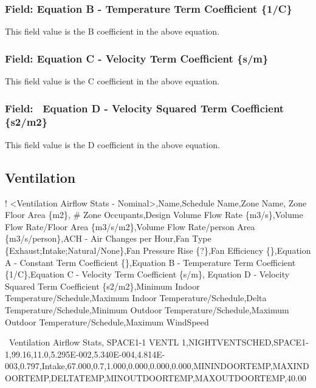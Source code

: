 \subsubsection{Field: Equation B - Temperature Term Coefficient \{1/C\}}\label{field-equation-b---temperature-term-coefficient-1c}

This field value is the B coefficient in the above equation.

\subsubsection{Field: Equation C - Velocity Term Coefficient \{s/m\}}\label{field-equation-c---velocity-term-coefficient-sm}

This field value is the C coefficient in the above equation.

\subsubsection{Field:~ Equation D - Velocity Squared Term Coefficient \{s2/m2\}}\label{field-equation-d---velocity-squared-term-coefficient-s2m2}

This field value is the D coefficient in the above equation.

\subsection{Ventilation}\label{ventilation}

! \textless{}Ventilation Airflow Stats - Nominal\textgreater{},Name,Schedule Name,Zone Name, Zone Floor Area \{m2\}, \# Zone Occupants,Design Volume Flow Rate \{m3/s\},Volume Flow Rate/Floor Area \{m3/s/m2\},Volume Flow Rate/person Area \{m3/s/person\},ACH - Air Changes per Hour,Fan Type \{Exhaust;Intake;Natural/None\},Fan Pressure Rise \{?\},Fan Efficiency \{\},Equation A - Constant Term Coefficient \{\},Equation B - Temperature Term Coefficient \{1/C\},Equation C - Velocity Term Coefficient \{s/m\}, Equation D - Velocity Squared Term Coefficient \{s2/m2\},Minimum Indoor Temperature/Schedule,Maximum Indoor Temperature/Schedule,Delta Temperature/Schedule,Minimum Outdoor Temperature/Schedule,Maximum Outdoor Temperature/Schedule,Maximum WindSpeed

~Ventilation Airflow Stats, SPACE1-1 VENTL 1,NIGHTVENTSCHED,SPACE1-1,99.16,11.0,5.295E-002,5.340E-004,4.814E-003,0.797,Intake,67.000,0.7,1.000,0.000,0.000,0.000,MININDOORTEMP,MAXINDOORTEMP,DELTATEMP,MINOUTDOORTEMP,MAXOUTDOORTEMP,40.00

